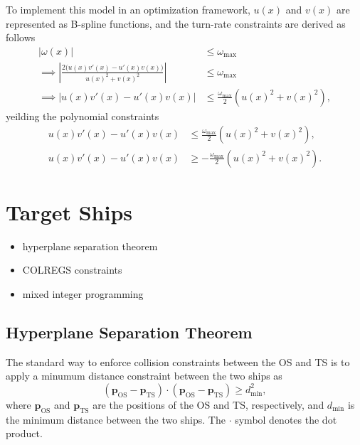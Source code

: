 To implement this model in an optimization framework, $u(x)$ and $v(x)$ are represented as B-spline functions, and the turn-rate constraints are derived as follows
\begin{equation*}
    \begin{aligned}
        |\omega(x)| &\le \omega_{\max} \\
        \implies \left|\frac{2\big(u(x)v'(x) - u'(x)v(x)\big)}{u(x)^2 + v(x)^2}\right| &\le \omega_{\max} \\
        \implies \left|u(x)v'(x) - u'(x)v(x)\right| &\le \frac{\omega_{\max}}{2}\left(u(x)^2 + v(x)^2\right),
    \end{aligned}
\end{equation*}
yeilding the polynomial constraints
\begin{subequations}\label{eq:dubins-ph-turn-rate}
    \begin{align}
        u(x)v'(x) - u'(x)v(x) &\le \frac{\omega_{\max}}{2}\left(u(x)^2 + v(x)^2\right), \\
        u(x)v'(x) - u'(x)v(x) &\ge -\frac{\omega_{\max}}{2}\left(u(x)^2 + v(x)^2\right).
    \end{align}
\end{subequations}

\section{Target Ships}
\begin{itemize}
    \item hyperplane separation theorem
    \item COLREGS constraints
    \item mixed integer programming
\end{itemize}

\subsection{Hyperplane Separation Theorem}
The standard way to enforce collision constraints between the OS and TS is to apply a minumum distance constraint between the two ships as
\begin{equation}\label{eq:minimum-distance}
    (\mathbf p_{\text{OS}} - \mathbf p_{\text{TS}}) \cdot (\mathbf p_{\text{OS}} - \mathbf p_{\text{TS}}) \geq d_{\text{min}}^2,
\end{equation}
where $\mathbf p_{\text{OS}}$ and $\mathbf p_{\text{TS}}$ are the positions of the OS and TS, respectively, and $d_{\text{min}}$ is the minimum distance between the two ships. The $\cdot$ symbol denotes the dot product. 

